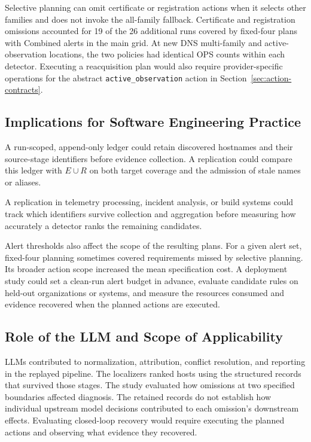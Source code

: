 \documentclass[sn-basic]{sn-jnl}%
\theoremstyle{thmstyleone}%
\theoremstyle{thmstyletwo}%
\theoremstyle{thmstylethree}%
\begin{document}
Selective planning can omit certificate or registration actions when it selects other families and does not invoke the all-family fallback. Certificate and registration omissions accounted for 19 of the 26 additional runs covered by fixed-four plans with Combined alerts in the main grid. At new DNS multi-family and active-observation locations, the two policies had identical OPS counts within each detector. Executing a reacquisition plan would also require provider-specific operations for the abstract \texttt{active\_observation} action in Section~\ref{sec:action-contracts}.

\subsection{Implications for Software Engineering Practice}
\label{sec:practice-implications}

A run-scoped, append-only ledger could retain discovered hostnames and their source-stage identifiers before evidence collection. A replication could compare this ledger with \(E \cup R\) on both target coverage and the admission of stale names or aliases.

A replication in telemetry processing, incident analysis, or build systems could track which identifiers survive collection and aggregation before measuring how accurately a detector ranks the remaining candidates.

Alert thresholds also affect the scope of the resulting plans. For a given alert set, fixed-four planning sometimes covered requirements missed by selective planning. Its broader action scope increased the mean specification cost. A deployment study could set a clean-run alert budget in advance, evaluate candidate rules on held-out organizations or systems, and measure the resources consumed and evidence recovered when the planned actions are executed.

\subsection{Role of the LLM and Scope of Applicability}
\label{sec:llm-role-scope}

LLMs contributed to normalization, attribution, conflict resolution, and reporting in the replayed pipeline. The localizers ranked hosts using the structured records that survived those stages. The study evaluated how omissions at two specified boundaries affected diagnosis. The retained records do not establish how individual upstream model decisions contributed to each omission's downstream effects. Evaluating closed-loop recovery would require executing the planned actions and observing what evidence they recovered.
\end{document}
